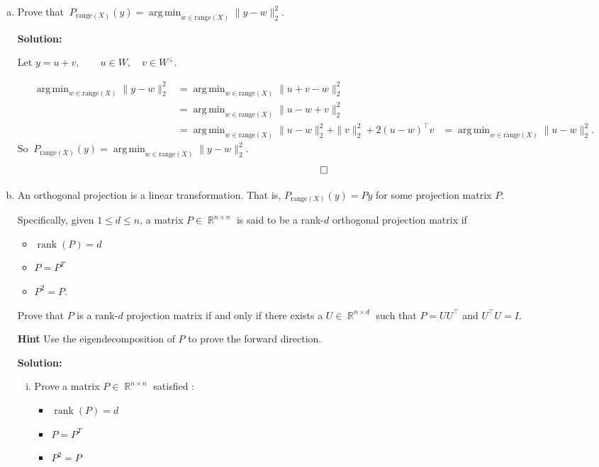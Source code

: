 \documentclass{article}
\DeclareMathOperator{\rank}{\mathrm{rank}}
\DeclareMathOperator{\R}{\mathbb{R}}
\DeclareMathOperator*{\argmin}{arg\,min}
\newenvironment{solution}{\color{blue} \smallskip \textbf{Solution:}}{}
\begin{document}
\begin{enumerate}[(a)]

    \item Prove that $\displaystyle \ P_{\text{range}(X)}(y) = \argmin_{w \in \mathrm{range}(X)} \|y - w\|_2^2$.

    \begin{solution}
        
        Let $y = u + v,\qquad u\in W,\quad v \in W^\perp$.

        \begin{align*}
            \argmin_{w \in \mathrm{range}(X)} \|y - w\|_2^2 &= \argmin_{w \in \mathrm{range}(X)} \|u + v - w\|_2^2 \\
            &= \argmin_{w \in \mathrm{range}(X)} \|u - w + v\|_2^2 \\
            &= \argmin_{w \in \mathrm{range}(X)} \|u - w\|_2^2 + \|v\|_2^2 + 2 (u - w)^\top v
            &= \argmin_{w \in \mathrm{range}(X)} \|u - w\|_2^2.
        \end{align*}
        So $\displaystyle \ P_{\text{range}(X)}(y) = \argmin_{w \in \mathrm{range}(X)} \|y - w\|_2^2$.
        \[ \qedhere \]
        
    \end{solution}

    \newpage
    \item An orthogonal projection is a linear transformation. That is, $P_{\text{range}(X)}(y) = Py$ for some projection matrix $P$. 
    
    Specifically, given $1 \le d \le n$, a matrix $P \in \R^{n \times n}$ is said to be a rank-$d$ orthogonal projection matrix if
    \begin{itemize}
        \item $\rank(P) = d$
        \item $P = P^{T}$
        \item $P^{2} = P$.
    \end{itemize}
    Prove that $P$ is a rank-$d$ projection matrix if and only if there exists a $U \in \R^{n \times d}$ such that $P = UU^\top$ and $U^{\top}U = I$.
    
    {\bf Hint} Use the eigendecomposition of $P$ to prove the forward direction.
    
    \begin{solution} 
        \begin{enumerate}[(i)]
            \item Prove a matrix $P \in \R^{n \times n}$ satisfied : 
            \begin{itemize}
                \item $\rank(P) = d$
                \item $P = P^{T}$
                \item $P^{2} = P$
            \end{itemize}


\end{enumerate}
\end{solution}
\end{enumerate}
\end{document}
